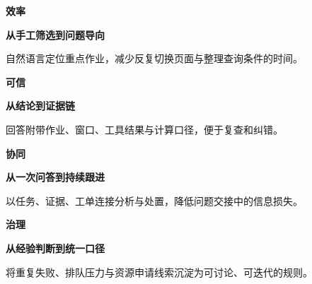 \documentclass[UTF8,fontset=none,a4paper]{ctexart}
\newcommand{\smallfont}{\fontsize{8.3}{12.6}\selectfont}
\newcommand{\kicker}[1]{{\fontsize{8.4}{11}\selectfont\bfseries\color{Teal}#1}}
\begin{document}
\begin{minipage}[t]{0.485\linewidth}
\begin{panel}[height=34mm]
\kicker{效率}\par\textbf{从手工筛选到问题导向}\par
\smallfont 自然语言定位重点作业，减少反复切换页面与整理查询条件的时间。
\end{panel}
\end{minipage}\hfill
\begin{minipage}[t]{0.485\linewidth}
\begin{panel}[height=34mm]
\kicker{可信}\par\textbf{从结论到证据链}\par
\smallfont 回答附带作业、窗口、工具结果与计算口径，便于复查和纠错。
\end{panel}
\end{minipage}\par
\vspace{3mm}
\begin{minipage}[t]{0.485\linewidth}
\begin{panel}[height=34mm]
\kicker{协同}\par\textbf{从一次问答到持续跟进}\par
\smallfont 以任务、证据、工单连接分析与处置，降低问题交接中的信息损失。
\end{panel}
\end{minipage}\hfill
\begin{minipage}[t]{0.485\linewidth}
\begin{panel}[height=34mm]
\kicker{治理}\par\textbf{从经验判断到统一口径}\par
\smallfont 将重复失败、排队压力与资源申请线索沉淀为可讨论、可迭代的规则。
\end{panel}
\end{minipage}\par
\vspace{4mm}
\end{document}
